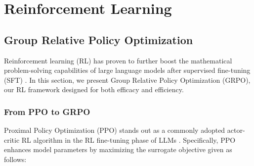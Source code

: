 \section{Reinforcement Learning}

\subsection{Group Relative Policy Optimization} Reinforcement learning (RL) has proven to further boost the mathematical problem-solving capabilities of large language models after supervised fine-tuning (SFT) \citep{wang2023math,wizardmath}. In this section, we present Group Relative Policy Optimization (GRPO), our RL framework designed for both efficacy and efficiency.

\subsubsection{From PPO to GRPO} Proximal Policy Optimization (PPO) \citep{schulman2017proximal} stands out as a commonly adopted actor-critic RL algorithm in the RL fine-tuning phase of LLMs \citep{ouyang2022training}. Specifically, PPO enhances model parameters by maximizing the surrogate objective given as follows:

